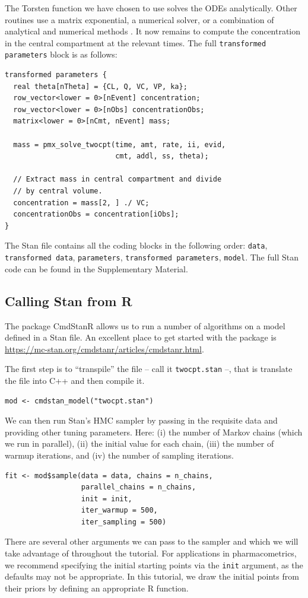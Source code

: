The Torsten function we have chosen to use solves the ODEs analytically.
Other routines use a matrix exponential, a numerical solver, or a combination of analytical and numerical methods \cite{Margossian:2017}.
It now remains to compute the concentration in the central compartment at the relevant times.
The full \texttt{transformed parameters} block is as follows:
\begin{lstlisting}
transformed parameters {
  real theta[nTheta] = {CL, Q, VC, VP, ka};
  row_vector<lower = 0>[nEvent] concentration;
  row_vector<lower = 0>[nObs] concentrationObs;
  matrix<lower = 0>[nCmt, nEvent] mass;

  mass = pmx_solve_twocpt(time, amt, rate, ii, evid, 
                          cmt, addl, ss, theta);

  // Extract mass in central compartment and divide 
  // by central volume.
  concentration = mass[2, ] ./ VC;
  concentrationObs = concentration[iObs];
}  
\end{lstlisting} 

The Stan file contains all the coding blocks in the following order: \texttt{data}, \texttt{transformed data}, \texttt{parameters}, \texttt{transformed parameters}, \texttt{model}.
The full Stan code can be found in the Supplementary Material.

\subsection{Calling Stan from R}\label{sec:call_stan_from_R}
The package CmdStanR allows us to run a number of algorithms on a model defined in a Stan file.
An excellent place to get started with the package is \url{https://mc-stan.org/cmdstanr/articles/cmdstanr.html}.

The first step is to ``transpile'' the file -- call it \texttt{twocpt.stan} --, that is translate the file into C++ and then compile it.
\begin{lstlisting}
mod <- cmdstan_model("twocpt.stan")
\end{lstlisting}
%
We can then run Stan's HMC sampler by passing in the requisite data and providing other tuning parameters.
Here: (i) the number of Markov chains (which we run in parallel), (ii) the initial value for each chain, (iii) the number of warmup iterations, and (iv) the number of sampling iterations.
\begin{lstlisting}
fit <- mod$sample(data = data, chains = n_chains,
                  parallel_chains = n_chains,
                  init = init,
                  iter_warmup = 500, 
                  iter_sampling = 500)
\end{lstlisting}
%
There are several other arguments we can pass to the sampler and which we will take advantage of throughout the tutorial.
For applications in pharmacometrics, we recommend specifying the initial starting points via the \texttt{init} argument, as the defaults may not be appropriate.
In this tutorial, we draw the initial points from their priors by defining an appropriate R function.

